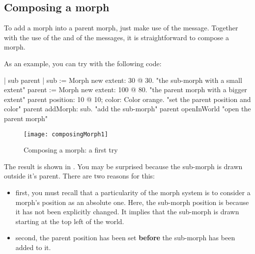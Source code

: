 \documentclass[a4paper,10pt,twoside]{book}
\begin{document}
\subsection{Composing a morph}
To add a morph into a parent morph, just make use of the  message. Together with the use of the  and of the  messages, it is straightforward to compose a morph.


As an example, you can try with the following code:

\begin{code}
| sub parent |
sub := Morph new extent: 30 @ 30. "the sub-morph with a small extent"
parent := Morph new extent: 100 @ 80. "the parent morph with a bigger extent"
parent position: 10 @ 10; color: Color orange. "set the parent position and color"
parent addMorph: sub. "add the sub-morph"
parent openInWorld "open the parent morph"
\end{code}

\begin{figure}[htbp]
\begin{center}
	\texttt{[image: composingMorph1]}
	\caption{Composing a morph: a first try}
\end{center}
\end{figure}

The result is shown in . You may be surprised because the sub-morph is drawn outside it's parent. There are two reasons for this:
\begin{itemize}
\item first, you must recall that a particularity of the morph system is to consider a morph's position as an absolute one. Here, the sub-morph position is  because it has not been explicitly changed. It implies that the sub-morph is drawn starting at the top left of the world.
\item second, the parent position has been set \textbf{before} the sub-morph has been added to it.
\end{itemize}

\end{document}
